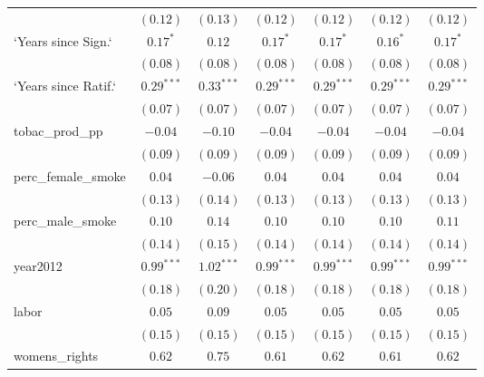 \begin{table}[!h]
\begin{center}
\begin{tabular}{l c c c c c c }
                        & $(0.12)$      & $(0.13)$      & $(0.12)$      & $(0.12)$      & $(0.12)$      & $(0.12)$      \\
`Years since Sign.`     & $0.17^{*}$    & $0.12$        & $0.17^{*}$    & $0.17^{*}$    & $0.16^{*}$    & $0.17^{*}$    \\
                        & $(0.08)$      & $(0.08)$      & $(0.08)$      & $(0.08)$      & $(0.08)$      & $(0.08)$      \\
`Years since Ratif.`    & $0.29^{***}$  & $0.33^{***}$  & $0.29^{***}$  & $0.29^{***}$  & $0.29^{***}$  & $0.29^{***}$  \\
                        & $(0.07)$      & $(0.07)$      & $(0.07)$      & $(0.07)$      & $(0.07)$      & $(0.07)$      \\
tobac\_prod\_pp         & $-0.04$       & $-0.10$       & $-0.04$       & $-0.04$       & $-0.04$       & $-0.04$       \\
                        & $(0.09)$      & $(0.09)$      & $(0.09)$      & $(0.09)$      & $(0.09)$      & $(0.09)$      \\
perc\_female\_smoke     & $0.04$        & $-0.06$       & $0.04$        & $0.04$        & $0.04$        & $0.04$        \\
                        & $(0.13)$      & $(0.14)$      & $(0.13)$      & $(0.13)$      & $(0.13)$      & $(0.13)$      \\
perc\_male\_smoke       & $0.10$        & $0.14$        & $0.10$        & $0.10$        & $0.10$        & $0.11$        \\
                        & $(0.14)$      & $(0.15)$      & $(0.14)$      & $(0.14)$      & $(0.14)$      & $(0.14)$      \\
year2012                & $0.99^{***}$  & $1.02^{***}$  & $0.99^{***}$  & $0.99^{***}$  & $0.99^{***}$  & $0.99^{***}$  \\
                        & $(0.18)$      & $(0.20)$      & $(0.18)$      & $(0.18)$      & $(0.18)$      & $(0.18)$      \\
labor                   & $0.05$        & $0.09$        & $0.05$        & $0.05$        & $0.05$        & $0.05$        \\
                        & $(0.15)$      & $(0.15)$      & $(0.15)$      & $(0.15)$      & $(0.15)$      & $(0.15)$      \\
womens\_rights          & $0.62$        & $0.75$        & $0.61$        & $0.62$        & $0.61$        & $0.62$        \\

\end{tabular}
\end{center}
\end{table}
